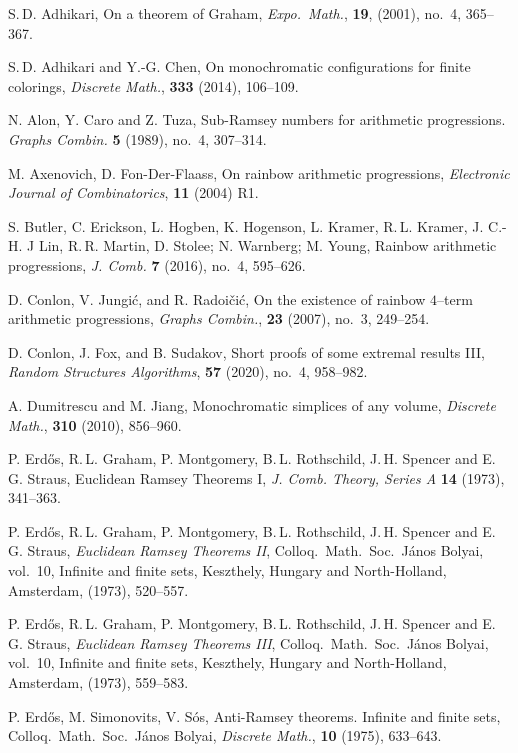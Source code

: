 \documentclass[a4paper, 11pt,reqno]{amsart}
\theoremstyle{definition}
\begin{document}
\begin{thebibliography}{}
 S.\,D. Adhikari, On a theorem of Graham,
{\em Expo.\ Math.}, {\bf 19}, (2001), no.\ 4, 365--367.

 S.\,D. Adhikari and Y.-G. Chen, On monochromatic configurations for finite colorings,
{\em Discrete Math.}, {\bf 333} (2014), 106--109.

 N. Alon, Y. Caro and Z. Tuza,  Sub-Ramsey numbers for arithmetic progressions.
{\em Graphs Combin.} {\bf 5} (1989), no.\ 4, 307--314.

 M. Axenovich, D. Fon-Der-Flaass, On rainbow arithmetic
progressions, {\em Electronic Journal of Combinatorics}, {\bf 11} (2004) R1.

S. Butler, C. Erickson, L. Hogben, K. Hogenson, L. Kramer, R.\,L. Kramer, J. C.-H. J Lin,
R.\,R. Martin, D. Stolee; N. Warnberg; M. Young,
Rainbow arithmetic progressions,
{\em J. Comb.} {\bf 7} (2016), no.\ 4, 595--626.

 D. Conlon, V. Jungi\'c,  and R. Radoi\v ci\'c,  On the existence of rainbow $4$--term
arithmetic progressions, {\em Graphs Combin.}, {\bf 23} (2007), no.\ 3, 249--254.

 D. Conlon, J. Fox, and B. Sudakov,
Short proofs of some extremal results III,
{\em Random Structures Algorithms}, {\bf 57} (2020), no.\ 4, 958--982.


 A. Dumitrescu and M. Jiang, Monochromatic
simplices of any volume, {\em Discrete Math.}, {\bf 310} (2010), 856--960.


P. Erd\H{o}s, R.\,L. Graham, P. Montgomery, B.\,L. Rothschild, J.\,H.
Spencer and E. G. Straus, Euclidean Ramsey Theorems I,
 {\em J. Comb. Theory, Series A}  {\bf 14} (1973), 341--363.


P. Erd\H{o}s, R.\,L. Graham, P. Montgomery, B.\,L. Rothschild, J.\,H.
Spencer and E.\,G. Straus, {\em Euclidean Ramsey Theorems II},
Colloq.\ Math.\ Soc.\ J\'anos Bolyai, vol.\ 10, Infinite and finite sets,
Keszthely, Hungary and North-Holland, Amsterdam, (1973), 520--557.

P. Erd\H{o}s, R.\,L. Graham, P. Montgomery, B.\,L. Rothschild, J.\,H.
Spencer and E.\,G. Straus, {\em Euclidean Ramsey Theorems III},
Colloq.\ Math.\ Soc.\ J\'anos Bolyai, vol.\ 10, Infinite and finite sets,
Keszthely, Hungary and North-Holland, Amsterdam, (1973), 559--583.

 P. Erd\H{o}s, M. Simonovits, V. S\'os,  Anti-Ramsey theorems.
Infinite and finite sets, Colloq.\ Math.\ Soc.\ J\'anos Bolyai,  {\em Discrete Math.}, {\bf 10} (1975), 633--643.


\end{thebibliography}
\end{document}

